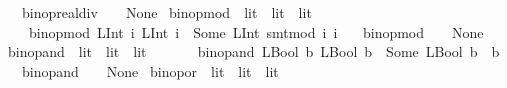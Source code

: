 \begin{isabellebody}
\ \ {\isacharbar}{\kern0pt}\ {\isachardoublequoteopen}binop{\isacharunderscore}{\kern0pt}real{\isacharunderscore}{\kern0pt}div\ {\isacharunderscore}{\kern0pt}\ {\isacharunderscore}{\kern0pt}\ {\isacharequal}{\kern0pt}\ None{\isachardoublequoteclose}\isanewline
\isanewline
{}\isamarkupfalse%
\ binop{\isacharunderscore}{\kern0pt}mod\ {\isacharcolon}{\kern0pt}{\isacharcolon}{\kern0pt}\ {\isachardoublequoteopen}lit\ {\isasymRightarrow}\ lit\ {\isasymrightharpoonup}\ lit{\isachardoublequoteclose}\isanewline
\ \ \ \isanewline
\ \ \ \ {\isachardoublequoteopen}binop{\isacharunderscore}{\kern0pt}mod\ {\isacharparenleft}{\kern0pt}LInt\ i{}{\isacharparenright}{\kern0pt}\ {\isacharparenleft}{\kern0pt}LInt\ i{}{\isacharparenright}{\kern0pt}\ {\isacharequal}{\kern0pt}\ Some\ {\isacharparenleft}{\kern0pt}LInt\ {\isacharparenleft}{\kern0pt}smt{\isacharunderscore}{\kern0pt}mod\ i{}\ i{}{\isacharparenright}{\kern0pt}{\isacharparenright}{\kern0pt}{\isachardoublequoteclose}\isanewline
\ \ {\isacharbar}{\kern0pt}\ {\isachardoublequoteopen}binop{\isacharunderscore}{\kern0pt}mod\ {\isacharunderscore}{\kern0pt}\ {\isacharunderscore}{\kern0pt}\ {\isacharequal}{\kern0pt}\ None{\isachardoublequoteclose}\isanewline
\isanewline
{}\isamarkupfalse%
\ binop{\isacharunderscore}{\kern0pt}and\ {\isacharcolon}{\kern0pt}{\isacharcolon}{\kern0pt}\ {\isachardoublequoteopen}lit\ {\isasymRightarrow}\ lit\ {\isasymrightharpoonup}\ lit{\isachardoublequoteclose}\isanewline
\ \ \isanewline
\ \ \ \ {\isachardoublequoteopen}binop{\isacharunderscore}{\kern0pt}and\ {\isacharparenleft}{\kern0pt}LBool\ b{}{\isacharparenright}{\kern0pt}\ {\isacharparenleft}{\kern0pt}LBool\ b{}{\isacharparenright}{\kern0pt}\ {\isacharequal}{\kern0pt}\ Some\ {\isacharparenleft}{\kern0pt}LBool\ {\isacharparenleft}{\kern0pt}b{}\ {\isasymand}\ b{}{\isacharparenright}{\kern0pt}{\isacharparenright}{\kern0pt}{\isachardoublequoteclose}\isanewline
\ \ {\isacharbar}{\kern0pt}\ {\isachardoublequoteopen}binop{\isacharunderscore}{\kern0pt}and\ {\isacharunderscore}{\kern0pt}\ {\isacharunderscore}{\kern0pt}\ {\isacharequal}{\kern0pt}\ None{\isachardoublequoteclose}\isanewline
\isanewline
{}\isamarkupfalse%
\ binop{\isacharunderscore}{\kern0pt}or\ {\isacharcolon}{\kern0pt}{\isacharcolon}{\kern0pt}\ {\isachardoublequoteopen}lit\ {\isasymRightarrow}\ lit\ {\isasymrightharpoonup}\ lit{\isachardoublequoteclose}\isanewline
\ \ \isanewline

\end{isabellebody}
